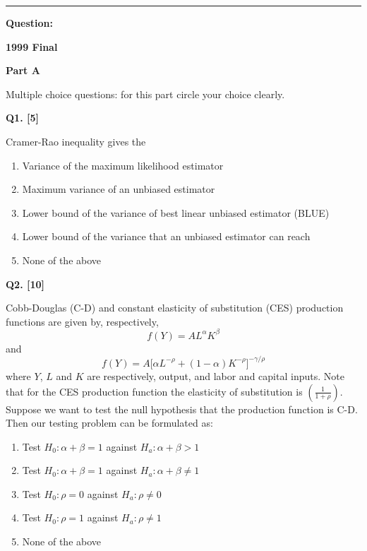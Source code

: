 \documentclass[11pt]{article}
\begin{document}
\medskip
\hrule
\medskip
\textbf{Question:}


\clearpage

\begin{center}
    {\Large\bfseries 1999 Final}
\end{center}

\vspace{1em}

\begin{center}
\textbf{Part A}
\end{center}

\begingroup
\small
\setlength{\parskip}{0.1em}
Multiple choice questions: for this part circle your choice clearly.

\medskip
\textbf{Q1. [5]}

Cramer-Rao inequality gives the
\begin{enumerate}
\setlength{\itemsep}{0pt}\setlength{\parsep}{0pt}\setlength{\topsep}{2pt}
\item[(a)] Variance of the maximum likelihood estimator
\item[(b)] Maximum variance of an unbiased estimator
\item[(c)] Lower bound of the variance of best linear unbiased estimator (BLUE)
\item[(d)] Lower bound of the variance that an unbiased estimator can reach
\item[(e)] None of the above
\end{enumerate}

\medskip
\textbf{Q2. [10]}

Cobb-Douglas (C-D) and constant elasticity of substitution (CES) production functions are given by, respectively,
\[
f(Y)=AL^{\alpha}K^{\beta}
\]
and
\[
f(Y)=A\bigl[\alpha L^{-\rho}+(1-\alpha)K^{-\rho}\bigr]^{-\gamma/\rho}
\]
where $Y$, $L$ and $K$ are respectively, output, and labor and capital inputs. Note that for the CES production function the elasticity of substitution is $\left(\frac{1}{1+\rho}\right)$. Suppose we want to test the null hypothesis that the production function is C-D. Then our testing problem can be formulated as:
\begin{enumerate}
\setlength{\itemsep}{0pt}\setlength{\parsep}{0pt}\setlength{\topsep}{2pt}
\item[(a)] Test $H_0:\alpha+\beta=1$ against $H_a:\alpha+\beta>1$
\item[(b)] Test $H_0:\alpha+\beta=1$ against $H_a:\alpha+\beta\neq1$
\item[(c)] Test $H_0:\rho=0$ against $H_a:\rho\neq0$
\item[(d)] Test $H_0:\rho=1$ against $H_a:\rho\neq1$
\item[(e)] None of the above
\end{enumerate}
\endgroup
\end{document}
